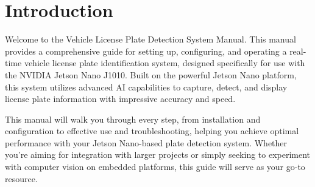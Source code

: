 %
%
%



\chapter{Introduction}

Welcome to the Vehicle License Plate Detection System Manual. This manual provides a comprehensive guide for setting up, configuring, and operating a real-time vehicle license plate identification system, designed specifically for use with the NVIDIA Jetson Nano J1010. Built on the powerful Jetson Nano platform, this system utilizes advanced AI capabilities to capture, detect, and display license plate information with impressive accuracy and speed.

This manual will walk you through every step, from installation and configuration to effective use and troubleshooting, helping you achieve optimal performance with your Jetson Nano-based plate detection system. Whether you're aiming for integration with larger projects or simply seeking to experiment with computer vision on embedded platforms, this guide will serve as your go-to resource.



